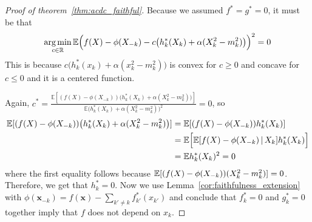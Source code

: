 \begin{proof}[Proof of theorem~\ref{thm:acdc_faithful}]
Because we assumed $f^* = g^* = 0$, it must be that
\[
\mathop{\text{\rm arg\,min}}_{c \in {\mathbb R}} 
{\mathbb E}\Big( f(X) - \phi(X_{-k}) - c\big( h^*_k(X_k) + \alpha(X_k^2 - m_k^2)\big) \Big)^2 = 0
\]
This is because $c\big( h^*_k(x_k) + \alpha(x_k^2 - m_k^2) \big)$ is convex for $c \geq 0$ and concave for $c \leq 0$ and it is a centered function.

Again, $c^* = \frac{\mathbb{E}[(f(X)-\phi(X_{-k}))\big( 
           h^*_k(X_k) + \alpha (X_k^2 - m_k^2) \big)]}{\mathbb{E}
       \big( h^*_k(X_k) + \alpha (X_k^2 - m_k^2) \big)^2} = 0$, so
\begin{align*}
\mathbb{E}[ (f(X)-\phi(X_{-k})) \big( h^*_k(X_k) + \alpha (X_k^2-m_k^2) \big) ] &= 
\mathbb{E}[ (f(X) - \phi(X_{-k})) h^*_k(X_k) ] \\
& = \mathbb{E}\Big[ \mathbb{E}[ f(X) - \phi(X_{-k}) {\,|\,} X_k]  h^*_k(X_k) \Big] \\
& = \mathbb{E} h^*_k(X_k)^2 = 0
\end{align*}
where the first equality follows because ${\mathbb E}[ (f(X) - \phi(X_{-k})) (X_k^2 - m_k^2)] = 0$. Therefore, we get that $h^*_k = 0$. Now we use
Lemma~\ref{cor:faithfulness_extension} with $\phi(\mathbf{x}_{-k}) =
f(\mathbf{x}) - \sum_{k' \neq k} f^*_{k'} (x_{k'})$ and conclude that
$f^*_k = 0$ and $g^*_k = 0$ together imply that $f$ does not depend on $x_k$.
\end{proof}







